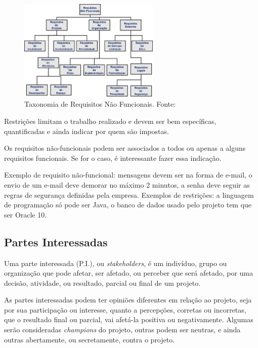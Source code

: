 \documentclass{article}
\newcommand{\othersize}{0.6\textwidth}
\begin{document}
\begin{figure}
    \centering
    \includegraphics[width=\othersize]{imagens/NonFunReq.png}
    \caption{Taxonomia de Requisitos Não Funcionais. Fonte: \citet{sommerville:software:2015}}
    \label{fig:nofunreq}
\end{figure}

Restrições limitam o trabalho realizado e devem ser bem específicas, quantificadas e ainda indicar por quem são impostas.

Os requisitos não-funcionais podem ser associados a todos ou apenas a alguns requisitos funcionais. Se for o caso, é interessante fazer essa indicação.

Exemplo de requisito não-funcional: mensagens devem ser na forma de e-mail, o envio de um e-mail deve demorar no máximo 2 minutos, a senha deve seguir as regras de segurança definidas pela empresa. Exemplos de restrições: a linguagem de programação só pode ser Java, o banco de dados usado pelo projeto tem que ser Oracle 10.

\subsection{Partes Interessadas}

Uma parte interessada (P.I.), ou \textit{stakeholders}, é um indivíduo, grupo ou organização que pode afetar, ser afetado, ou perceber que será afetado, por uma decisão, atividade, ou resultado, parcial ou final de um projeto\citep{pmbok:6}.

As partes interessadas  podem ter opiniões diferentes em relação ao projeto, seja por sua participação ou interesse, quanto a percepções, corretas ou incorretas, que o resultado final ou parcial, vai afetá-la positiva ou negativamente.  Algumas serão consideradas \textit{champions} do projeto, outras podem ser neutras, e ainda outras abertamente, ou secretamente, contra o projeto.
\end{document}
